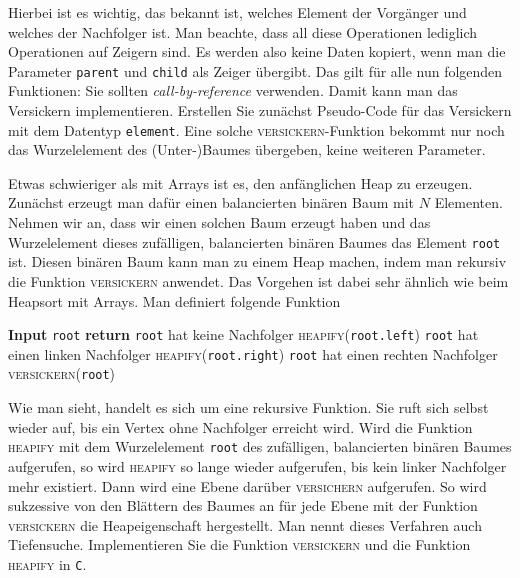 \documentclass[tikz,12pt]{article}
\begin{document}
Hierbei ist es wichtig, das bekannt ist, welches Element der Vorgänger und welches der Nachfolger ist. 
Man beachte, dass all diese Operationen lediglich Operationen auf Zeigern sind. 
Es werden also keine Daten kopiert, wenn man die Parameter \texttt{parent} und \texttt{child} als Zeiger übergibt.
Das gilt für alle nun folgenden Funktionen: Sie sollten \emph{call-by-reference} verwenden.
Damit kann man das Versickern implementieren.
Erstellen Sie zunächst Pseudo-Code für das Versickern mit dem Datentyp \texttt{element}.
Eine solche \textsc{versickern}-Funktion bekommt nur noch das Wurzelelement des (Unter-)Baumes übergeben, keine weiteren Parameter.

Etwas schwieriger als mit Arrays ist es, den anfänglichen Heap zu erzeugen.
Zunächst erzeugt man dafür einen balancierten binären Baum mit $N$ Elementen.
Nehmen wir an, dass wir einen solchen Baum erzeugt haben und das Wurzelelement dieses zufälligen, balancierten binären Baumes das Element \texttt{root} ist.
Diesen binären Baum kann man zu einem Heap machen, indem man rekursiv die Funktion \textsc{versickern} anwendet.
Das Vorgehen ist dabei sehr ähnlich wie beim Heapsort mit Arrays.
Man definiert folgende Funktion
\begin{algorithmic}[1]
  \State\textbf{Input} \texttt{root}
  \State\textbf{return}
  \Comment \texttt{root} hat keine Nachfolger
  \Else
  \State\textsc{heapify}(\texttt{root.left})
  \Comment \texttt{root} hat einen linken Nachfolger
  \EndIf
  \State\textsc{heapify}(\texttt{root.right})
  \Comment \texttt{root} hat einen rechten Nachfolger
  \EndIf
  \State\textsc{versickern}(\texttt{root})
  \EndProcedure
\end{algorithmic}
Wie man sieht, handelt es sich um eine rekursive Funktion.
Sie ruft sich selbst wieder auf, bis ein Vertex ohne Nachfolger erreicht wird.
Wird die Funktion \textsc{heapify} mit dem Wurzelelement \texttt{root} des zufälligen, balancierten binären Baumes aufgerufen, so wird \textsc{heapify} so lange wieder aufgerufen, bis kein linker Nachfolger mehr existiert.
Dann wird eine Ebene darüber \textsc{versichern} aufgerufen.
So wird sukzessive von den Blättern des Baumes an für jede Ebene mit der Funktion \textsc{versickern} die Heapeigenschaft hergestellt. 
Man nennt dieses Verfahren auch Tiefensuche.
Implementieren Sie die Funktion \textsc{versickern} und die Funktion \textsc{heapify} in \texttt{C}.
\end{document}

